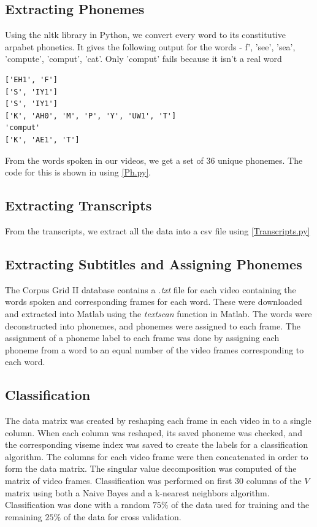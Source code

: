 \documentclass[a4paper]{article}
\begin{document}
\subsection{Extracting Phonemes}

Using the nltk library in Python, we convert every word to its constitutive arpabet phonetics. It gives the following output for the words - f', 'see', 'sea', 'compute', 'comput', 'cat'. Only 'comput' fails because it isn't a real word
\begin{verbatim}
['EH1', 'F']
['S', 'IY1']
['S', 'IY1']
['K', 'AH0', 'M', 'P', 'Y', 'UW1', 'T']
'comput'
['K', 'AE1', 'T']
\end{verbatim}

From the words spoken in our videos, we get a set of 36 unique phonemes. The code for this is shown in using \ref{Ph.py}.



\subsection{Extracting Transcripts}

From the transcripts, we extract all the data into a csv file using \ref{Transcripts.py}

\subsection{Extracting Subtitles and Assigning Phonemes}
The Corpus Grid II database contains a {\it .txt} file for each video containing the words spoken and corresponding frames for each word.  These were downloaded and extracted into Matlab using the {\it textscan} function in Matlab.  The words were deconstructed into phonemes, and phonemes were assigned to each frame.  The assignment of a phoneme label to each frame was done by assigning each phoneme from a word to an equal number of the video frames corresponding to each word. 

\subsection{Classification}
The data matrix was created by reshaping each frame in each video in to a single column.  When each column was reshaped, its saved phoneme was checked, and the corresponding viseme index was saved to create the labels for a classification algorithm. The columns for each video frame were then concatenated in order to form the data matrix.  The singular value decomposition was computed of the matrix of video frames.  Classification was performed on first 30 columns of the $V$ matrix using both a Naive Bayes and a k-nearest neighbors algorithm.  Classification was done with a random $75\%$ of the data used for training and the remaining $25\%$ of the data for cross validation.
\end{document}
